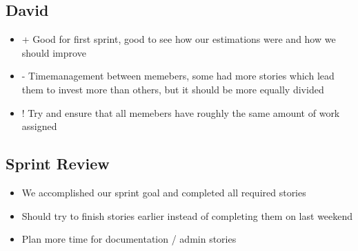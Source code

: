 \subsection{David}
\begin{itemize}
    \item + Good for first sprint, good to see how our estimations were and how we should improve
    \item - Timemanagement between memebers, some had more stories which lead them to invest more than others, but it should be more equally divided
    \item ! Try and ensure that all memebers have roughly the same amount of work assigned
\end{itemize}

\subsection{Sprint Review}
\begin{itemize}
    \item We accomplished our sprint goal and completed all required stories
    \item Should try to finish stories earlier instead of completing them on last weekend
    \item Plan more time for documentation / admin stories
\end{itemize}
